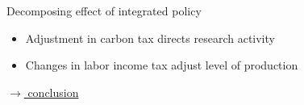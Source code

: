 \documentclass[11pt,aspectratio=169]{beamer}
\begin{document}
\begin{frame}{Decomposing effect of integrated policy}
\begin{figure}
\begin{subfigure}{0.45\textwidth}
		\end{subfigure}
	\end{figure}
	\vspace{3mm}
	\begin{block}{}
		\begin{itemize}
			\item Adjustment in carbon tax directs research activity
			\item Changes in labor income tax adjust level of production %
		\end{itemize}
	\end{block}	
	
	\vspace{-5.5mm}
	\hfill
	\hyperlink{conc}{\tiny{$\rightarrow$ conclusion}}
\end{frame}

\end{document}
